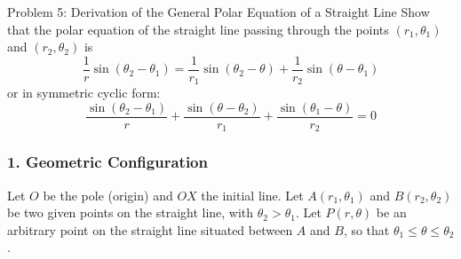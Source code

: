 \documentclass[11pt,a4paper]{article}
\begin{document}
\clearpage
\noindent
\begin{problembox}{Problem 5: Derivation of the General Polar Equation of a Straight Line}
Show that the polar equation of the straight line passing through the points $(r_1, \theta_1)$ and $(r_2, \theta_2)$ is
\[
\frac{1}{r}\sin(\theta_2 - \theta_1) = \frac{1}{r_1}\sin(\theta_2 - \theta) + \frac{1}{r_2}\sin(\theta - \theta_1)
\]
or in symmetric cyclic form:
\[
\frac{\sin(\theta_2 - \theta_1)}{r} + \frac{\sin(\theta - \theta_2)}{r_1} + \frac{\sin(\theta_1 - \theta)}{r_2} = 0
\]
\end{problembox}

\subsubsection*{1. Geometric Configuration}
Let $O$ be the pole (origin) and $OX$ the initial line. Let $A(r_1, \theta_1)$ and $B(r_2, \theta_2)$ be two given points on the straight line, with $\theta_2 > \theta_1$.
Let $P(r, \theta)$ be an arbitrary point on the straight line situated between $A$ and $B$, so that $\theta_1 \le \theta \le \theta_2$.
\end{document}
